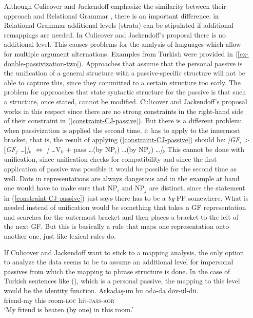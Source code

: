 \begin{exe}
\begin{xlist}[iv.]
\begin{exe}
\begin{xlist}[iv.]
Although Culicover and Jackendoff emphasize the similarity between their approach and Relational
Grammar \citep{Perlmutter83a-ed}, there is an important difference: in Relational Grammar additional levels (strata) can be stipulated
if additional remappings are needed. In Culicover and Jackendoff's proposal there is no additional
level. This causes problems for the analysis of languages which allow for multiple argument alternations. Examples from Turkish were provided in
(\ref{ex-double-passivization-two}). Approaches that assume that the personal passive is the unification
of a general structure with a passive-specific structure will not be able to capture this, since they committed
to a certain structure too early. The problem for approaches that state syntactic structure for the
passive is that such a structure, once stated, cannot be modified. Culicover and Jackendoff's 
 proposal works in this respect since there are no strong constraints in the
right-hand side of their constraint in (\ref{constraint-CJ-passive}). But there is a different
problem: when passivization is applied the second time, it has to apply to the innermost bracket,
that is, the result of applying (\ref{constraint-CJ-passive}) should be:
\ea
{}\emph{[GF}$_i$ > [\emph{GF}$_j$ \ldots]\emph{]}$_k$ $\Leftrightarrow$ \emph{[} \ldots V$_k$ $+$ pass \ldots (by NP$_i$) \ldots (by NP$_j$) \ldots\emph{]}$_k$
\z
This cannot be done with unification, since unification checks for compatibility and since the first
application of passive was possible it would be possible for the second time as well. Dots in
representations are always dangerous and in the example at hand one would have to make sure that
NP$_i$ and NP$_j$ are distinct, since the statement in (\ref{constraint-CJ-passive}) just says there
has to be a \emph{by}-PP somewhere. What is needed instead of unification would be something that takes a GF representation
and searches for the outermost bracket and then places a bracket to the left of the next GF. But
this is basically a rule that maps one representation onto another one, just like lexical rules do.

If Culicover and Jackendoff want to stick to a mapping analysis, the only option to analyze the data
seems to be to assume an additional level for impersonal passives from which the mapping to phrase
structure is done. In the case of Turkish sentences like (), which is a personal passive, the mapping
to this level would be the identity function.   
\ea
\gll Arkadaş-ım bu oda-da döv-ül-dü.\\
     friend-my  this   room-\textsc{loc} hit-\textsc{pass}-\textsc{aor}\\
\glt `My friend is beaten (by one) in this room.'
\z


\end{xlist}
\end{exe}
\end{xlist}
\end{exe}
